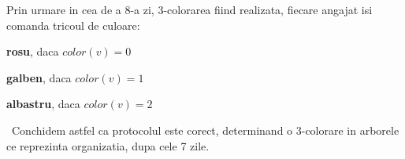 \documentclass{article}
\begin{document}
\newline
\newline
Prin urmare in cea de a 8-a zi, 3-colorarea fiind realizata, fiecare angajat isi comanda tricoul de culoare:
\begin{center}
\textbf{rosu}, daca $color(v)=0$
\end{center}
\begin{center}
\textbf{galben}, daca $color(v)=1$
\end{center}
\begin{center}
\textbf{albastru}, daca $color(v)=2$
\end{center}
\
Conchidem astfel ca protocolul este corect, determinand o 3-colorare in arborele ce reprezinta organizatia, dupa cele 7 zile.
\
\end{document}
